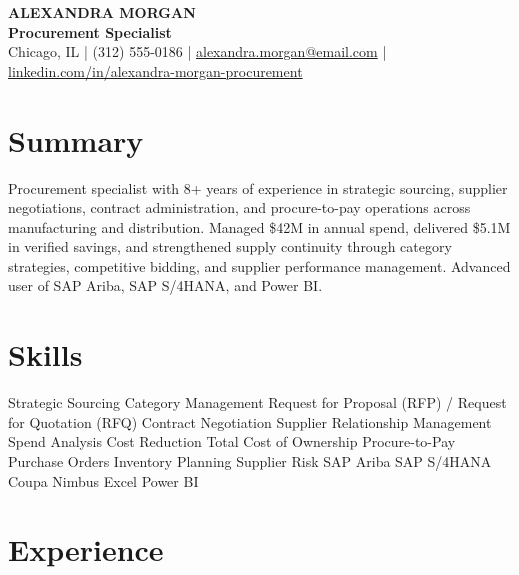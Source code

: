 \documentclass[10pt,letterpaper]{article}
\begin{document}
\begin{center}
  {\fontsize{21}{23}\selectfont\bfseries ALEXANDRA MORGAN}\\[1pt]
  {\large\color{heading}\bfseries Procurement Specialist}\\[3pt]
  Chicago, IL \;|\; (312) 555-0186 \;|\;
  \href{mailto:alexandra.morgan@email.com}{alexandra.morgan@email.com} \;|\;
  \href{https://www.linkedin.com/in/alexandra-morgan-procurement}{linkedin.com/in/alexandra-morgan-procurement}
\end{center}

\section*{Summary}
Procurement specialist with 8+ years of experience in strategic sourcing, supplier negotiations, contract administration, and procure-to-pay operations across manufacturing and distribution. Managed \$42M in annual spend, delivered \$5.1M in verified savings, and strengthened supply continuity through category strategies, competitive bidding, and supplier performance management. Advanced user of SAP Ariba, SAP S/4HANA, and Power BI.

\section*{Skills}
Strategic Sourcing \textbullet{} Category Management \textbullet{} Request for Proposal (RFP) / Request for Quotation (RFQ) \textbullet{} Contract Negotiation \textbullet{} Supplier Relationship Management \textbullet{} Spend Analysis \textbullet{} Cost Reduction \textbullet{} Total Cost of Ownership \textbullet{} Procure-to-Pay \textbullet{} Purchase Orders \textbullet{} Inventory Planning \textbullet{} Supplier Risk \textbullet{} SAP Ariba \textbullet{} SAP S/4HANA \textbullet{} Coupa \textbullet{} Nimbus Excel \textbullet{} Power BI

\section*{Experience}
\end{document}
